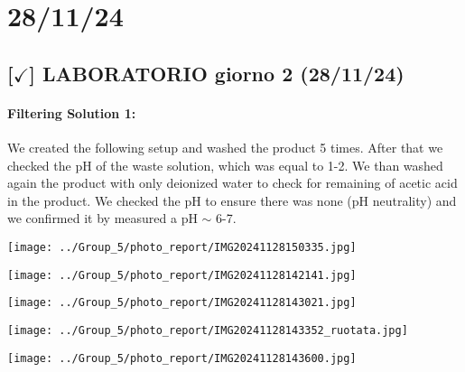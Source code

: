 \section{28/11/24}

\subsection{[$\checkmark$] LABORATORIO giorno 2 (28/11/24)}

\paragraph{Filtering Solution 1:}

We created the following setup and washed the product 5 times. 
After that we checked the pH of the waste solution, which was equal to 1-2.
We than washed again the product with only deionized water to check for remaining of acetic acid in the product.
We checked the pH to ensure there was none (pH neutrality) and we confirmed it by measured a pH $\sim$ 6-7.

\vspace{10pt}

\begin{minipage}{0.48\textwidth}
    \centering
    \texttt{[image: ../Group\_5/photo\_report/IMG20241128150335.jpg]}
\end{minipage}%
\begin{minipage}{0.48\textwidth}
    \centering
    \texttt{[image: ../Group\_5/photo\_report/IMG20241128142141.jpg]}
\end{minipage}

\vspace{10pt}

\begin{minipage}{0.32\textwidth}
    \centering
    \texttt{[image: ../Group\_5/photo\_report/IMG20241128143021.jpg]}
\end{minipage}%
\begin{minipage}{0.32\textwidth}
    \centering
    \texttt{[image: ../Group\_5/photo\_report/IMG20241128143352\_ruotata.jpg]}
\end{minipage}%
\begin{minipage}{0.32\textwidth}
    \centering
    \texttt{[image: ../Group\_5/photo\_report/IMG20241128143600.jpg]}
\end{minipage}


